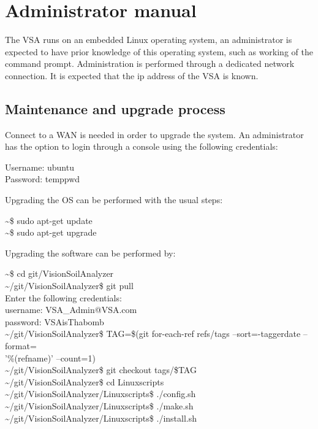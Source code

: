 \documentclass[11pt,fleqn,,a4paper,twoside,openright]{book}
\begin{document}
\section{Administrator manual}
The VSA runs on an embedded Linux operating system, an administrator is expected to have prior knowledge of this operating system, such as working of the command prompt. Administration is performed through a dedicated network connection. It is expected that the ip address of the VSA is known.

\subsection{Maintenance and upgrade process}
Connect to a WAN is needed in order to upgrade the system. An administrator has the option to login through a console using the following credentials:
\begin{sBox}
	Username: ubuntu \\
	Password: temppwd \\
\end{sBox}

Upgrading the OS can be performed with the usual steps:
\begin{sBox}
	\textasciitilde\$ sudo apt-get update \\
	\textasciitilde\$ sudo apt-get upgrade \\
\end{sBox}

Upgrading the software can be performed by:
\begin{sBox}
	\textasciitilde\$ cd git/VisionSoilAnalyzer \\
	\textasciitilde/git/VisionSoilAnalyzer\$ git pull \\
	Enter the following credentials: \\
	username: VSA\_Admin@VSA.com \\
	password: VSAisThabomb \\
	\textasciitilde/git/VisionSoilAnalyzer\$ TAG=\$(git for-each-ref refs/tags --sort=-taggerdate --format=\\
	'\%(refname)' --count=1) \\
	\textasciitilde/git/VisionSoilAnalyzer\$ git checkout tags/\$TAG \\
	\textasciitilde/git/VisionSoilAnalyzer\$ cd Linuxscripts \\
	\textasciitilde/git/VisionSoilAnalyzer/Linuxscripts\$ ./config.sh \\
	\textasciitilde/git/VisionSoilAnalyzer/Linuxscripts\$ ./make.sh \\
	\textasciitilde/git/VisionSoilAnalyzer/Linuxscripts\$ ./install.sh \\
\end{sBox}
\end{document}
